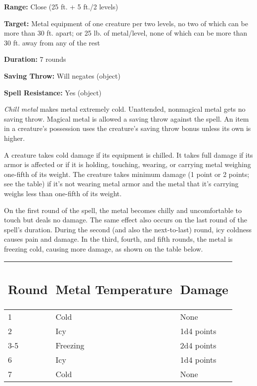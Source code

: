 \documentclass{article}
\begin{document}
\textbf{Range:} Close (25 ft. + 5 ft./2 levels)

\textbf{Target: }Metal equipment of one creature per two levels, no two of which 
can be more than 30 ft. apart; or 25 lb. of metal/level, none of which can be more 
than 30 ft. away from any of the rest

\textbf{Duration:} 7 rounds

\textbf{Saving Throw: }Will negates (object)

\textbf{Spell Resistance:} Yes (object)

\textit{Chill metal }makes metal extremely cold. Unattended, nonmagical metal gets 
no saving throw. Magical metal is allowed a saving throw against the spell. An 
item in a creature's possession uses the creature's saving throw bonus unless its 
own is higher.

A creature takes cold damage if its equipment is chilled. It takes full damage 
if its armor is affected or if it is holding, touching, wearing, or carrying metal 
weighing one-fifth of its weight. The creature takes minimum damage (1 point or 
2 points; see the table) if it's not wearing metal armor and the metal that it's 
carrying weighs less than one-fifth of its weight.

On the first round of the spell, the metal becomes chilly and uncomfortable to 
touch but deals no damage. The same effect also occurs on the last round of the 
spell's duration. During the second (and also the next-to-last) round, icy coldness 
causes pain and damage. In the third, fourth, and fifth rounds, the metal is freezing 
cold, causing more damage, as shown on the table below.

\begin{tabular}{|>{\raggedright}p{27pt}|>{\raggedright}p{82pt}|>{\raggedright}p{40pt}|}
\hline
\subsection*{R\textbf{ound}} & \subsection*{M\textbf{etal Temperature}} & \subsection*{D\textbf{amage}}\tabularnewline
\hline
1 & Cold & None\tabularnewline
\hline
2 & Icy & 1d4 points\tabularnewline
\hline
3-5 & Freezing & 2d4 points\tabularnewline
\hline
6 & Icy & 1d4 points\tabularnewline
\hline
7 & Cold & None\tabularnewline
\hline
\end{tabular}
\end{document}
